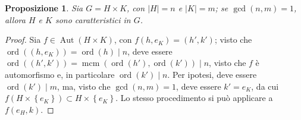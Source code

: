 \documentclass[11pt]{article}
\theoremstyle{style}
\newtheorem{prop}{Proposizione}[section]
\numberwithin{equation}{subsection}
\begin{document}
\begin{prop}
	Sia $G = H\times K$, con $\lvert H \rvert = n$ e $\lvert K \rvert = m$; se $\operatorname{gcd}(n,m) =1$, allora $H$ e $K$ sono caratteristici in $G$.
\end{prop}
	\begin{proof}
		Sia $f \in \operatorname{Aut} (H \times K)$, con $f(h,e_K) = (h',k')$; visto che $\operatorname{ord}((h,e_K)) = \operatorname{ord}(h)  \mid n$, deve essere $\operatorname{ord}((h',k')) = \operatorname{mcm} (\operatorname{ord}(h') ,\operatorname{ord}(k') )  \mid n$, visto che $f$ \`e automorfismo e, in particolare $\operatorname{ord}(k')  \mid n$.
		Per ipotesi, deve essere $\operatorname{ord}(k')  \mid m $, ma, visto che $\operatorname{gcd}(n,m) =1 $, deve essere $k' = e_K$, da cui $f(H \times \left\{ e_K \right\} ) \subset H \times \left\{ e_K \right\} $.
		Lo stesso procedimento si pu\`o applicare a $f(e_H, k)$.
	\end{proof}
\end{document}
